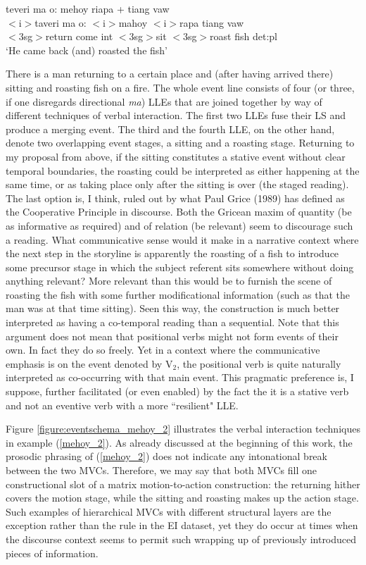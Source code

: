 \ea \label{mehoy_2}
\gll teveri ma o: mehoy riapa + tiang vaw \\
$<$i$>$taveri ma o: $<$i$>$mahoy $<$i$>$rapa tiang vaw \\
\glc $<$3\acs{sg}$>$return come \acs{int} $<$3\acs{sg}$>$sit $<$3\acs{sg}$>$roast fish \acs{det}:\acs{pl}\\
\glft `He came back (and) roasted the fish' \ 
\z
\xe

There is a man returning to a certain place and (after having arrived there) sitting and roasting fish on a fire. The whole event line consists of four (or three, if one disregards directional \textit{ma}) LLEs that are joined together by way of different techniques of verbal interaction. The first two LLEs fuse their LS and produce a merging event. The third and the fourth LLE, on the other hand, denote two overlapping event stages, a sitting and a roasting stage. Returning to my proposal from above, if the sitting constitutes a stative event without clear temporal boundaries, the roasting could be interpreted as either happening at the same time, or as taking place only after the sitting is over (the staged reading). The last option is, I think, ruled out by what Paul Grice (1989) has defined as the Cooperative Principle in discourse. Both the Gricean maxim of quantity (be as informative as required) and of relation (be relevant) seem to discourage such a reading. What communicative sense would it make in a narrative context where the next step in the storyline is apparently the roasting of a fish to introduce some precursor stage in which the subject referent sits somewhere without doing anything relevant? More relevant than this would be to furnish the scene of roasting the fish with some further modificational information (such as that the man was at that time sitting). Seen this way, the construction is much better interpreted as having a co-temporal reading than a sequential. Note that this argument does not mean that positional verbs might not form events of their own. In fact they do so freely. Yet in a context where the communicative emphasis is on the event denoted by V$_2$, the positional verb is quite naturally interpreted as co-occurring with that main event. This pragmatic preference is, I suppose, further facilitated (or even enabled) by the fact the it is a stative verb and not an eventive verb with a more ``resilient" LLE. 

Figure \ref{figure:eventschema_mehoy_2} illustrates the verbal interaction techniques in example (\ref{mehoy_2}). As already discussed at the beginning of this work, the prosodic phrasing of (\ref{mehoy_2}) does not indicate any intonational break between the two MVCs. Therefore, we may say that both MVCs fill one constructional slot of a matrix motion-to-action construction: the returning hither covers the motion stage, while the sitting and roasting makes up the action stage. Such examples of hierarchical MVCs with different structural layers are the exception rather than the rule in the EI dataset, yet they do occur at times when the discourse context seems to permit such wrapping up of previously introduced pieces of information.

